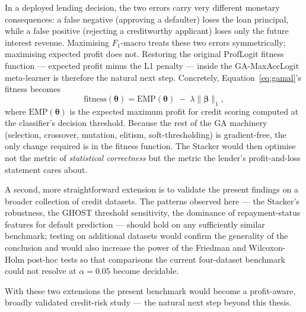 In a deployed lending decision, the two errors carry very different
monetary consequences: a false negative (approving a defaulter) loses
the loan principal, while a false positive (rejecting a creditworthy
applicant) loses only the future interest revenue.  Maximising
$F_1$-macro treats these two errors symmetrically; maximising
expected profit does not.  Restoring the original ProfLogit fitness
function --- expected profit minus the L1 penalty --- inside the
GA-MaxAccLogit meta-learner is therefore the natural next step.
Concretely, Equation~\eqref{eq:gamal}'s fitness becomes
\[
\mathrm{fitness}(\boldsymbol{\theta})=\mathrm{EMP}(\boldsymbol{\theta})\;-\;\lambda\lVert\boldsymbol{\beta}\rVert_1,
\]
where $\mathrm{EMP}(\boldsymbol{\theta})$ is the expected maximum
profit for credit scoring computed at the classifier's decision
threshold.  Because the rest of the GA machinery
(selection, crossover, mutation, elitism, soft-thresholding) is
gradient-free, the only change required is in the fitness function.
The Stacker would then optimise not the metric of \emph{statistical
correctness} but the metric the lender's profit-and-loss statement
cares about.

A second, more straightforward extension is to validate the
present findings on a broader collection of credit datasets.  The
patterns observed here --- the Stacker's robustness, the GHOST
threshold sensitivity, the dominance of repayment-status features
for default prediction --- should hold on any sufficiently similar
benchmark; testing on additional datasets would confirm the
generality of the conclusion and would also increase the power of
the Friedman and Wilcoxon-Holm post-hoc tests so that comparisons
the current four-dataset benchmark could not resolve at
$\alpha=0.05$ become decidable.

With these two extensions the present benchmark would become a
profit-aware, broadly validated credit-risk study --- the natural
next step beyond this thesis.
